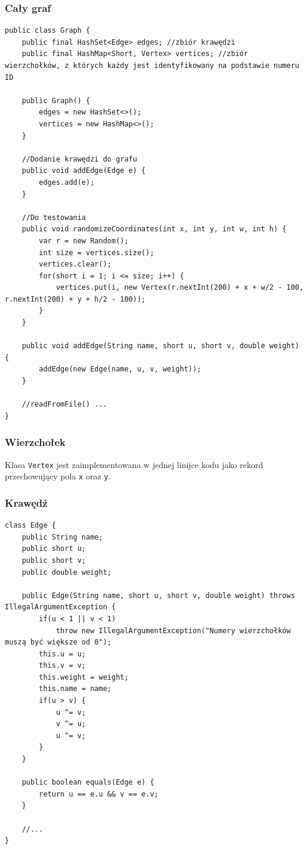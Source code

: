 \documentclass[11pt,a4paper]{article}
\begin{document}
\subsubsection{Cały graf}
\begin{verbatim}
public class Graph {
	public final HashSet<Edge> edges; //zbiór krawędzi
	public final HashMap<Short, Vertex> vertices; //zbiór wierzchołków, z których każdy jest identyfikowany na podstawie numeru ID

	public Graph() {
		edges = new HashSet<>();
		vertices = new HashMap<>();
	}

    //Dodanie krawędzi do grafu
	public void addEdge(Edge e) {
		edges.add(e);
	}

	//Do testowania
	public void randomizeCoordinates(int x, int y, int w, int h) {
		var r = new Random();
		int size = vertices.size();
		vertices.clear();
		for(short i = 1; i <= size; i++) {
			vertices.put(i, new Vertex(r.nextInt(200) + x + w/2 - 100, r.nextInt(200) + y + h/2 - 100));
		}
	}

	public void addEdge(String name, short u, short v, double weight) {
		addEdge(new Edge(name, u, v, weight));
	}

	//readFromFile() ...
}
\end{verbatim}

\subsubsection{Wierzchołek}
Klasa \verb|Vertex| jest zaimplementowana w jednej linijce kodu jako rekord przechowujący pola \verb|x| oraz \verb|y|.

\subsubsection{Krawędź}
\begin{verbatim}
class Edge {
	public String name;
	public short u;
	public short v;
	public double weight;

	public Edge(String name, short u, short v, double weight) throws IllegalArgumentException {
		if(u < 1 || v < 1)
			throw new IllegalArgumentException("Numery wierzchołków muszą być większe od 0");
		this.u = u;
		this.v = v;
		this.weight = weight;
		this.name = name;
		if(u > v) {
			u ^= v;
			v ^= u;
			u ^= v;
		}
	}

	public boolean equals(Edge e) {
		return u == e.u && v == e.v;
	}

    //...
}
\end{verbatim}
\end{document}
